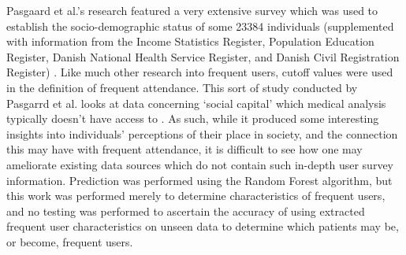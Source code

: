 


Pasgaard et al.'s research featured a very extensive survey which was used to establish the socio-demographic status of some 23384 individuals (supplemented with information from the Income Statistics Register, Population Education Register, Danish National Health Service Register, and Danish Civil Registration Register) \cite{pasgaard2018social}. Like much other research into frequent users, cutoff values were used in the definition of frequent attendance. This sort of study conducted by Pasgarrd et al. looks at data concerning `social capital' \cite{coleman1988social} which medical analysis typically doesn't have access to \cite{frost2017using}. As such, while it produced some interesting insights into individuals' perceptions of their place in society, and the connection this may have with frequent attendance, it is difficult to see how one may ameliorate existing data sources which do not contain such in-depth user survey information. Prediction was performed using the Random Forest algorithm, but this work was performed merely to determine characteristics of frequent users, and no testing was performed to ascertain the accuracy of using extracted  frequent user characteristics on unseen data to determine which patients may be, or become, frequent users. 

